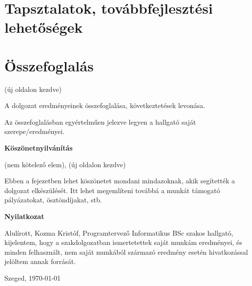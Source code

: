 \documentclass[a4paper,12pt]{report}
\theoremstyle{definition}
\theoremstyle{remark}
\begin{document}
\chapter*{Tapsztalatok, továbbfejlesztési lehetőségek}


\chapter{Összefoglalás}

(új oldalon kezdve)

A dolgozat eredményeinek összefoglalása, következtetések levonása.

Az összefoglalásban egyértelműen jelezve legyen a hallgató saját szerepe/eredményei.


\newpage
{\Huge \bf Köszönetnyilvánítás}


\vspace{2 cm}

(nem kötelező elem), (új oldalon kezdve) 

Ebben a fejezetben lehet köszönetet mondani mindazoknak, akik segítették a dolgozat elkészülését. Itt lehet megemlíteni továbbá a munkát támogató pályázatokat, ösztöndíjakat, stb.

\newpage
{\Huge \bf Nyilatkozat}


\vspace{2 cm}

Alulírott, Kozma Kristóf, Programtervező Informatikus BSc szakos hallgató, kijelentem, hogy a szakdolgozatban ismertetettek saját munkám eredményei, és minden felhasznált, nem saját munkából származó eredmény esetén hivatkozással jelöltem annak forrását. 


\begin{flushleft}
\vspace*{1cm}
Szeged, \today
\end{flushleft}

\begin{flushright}
   \vspace*{1cm}
   \makebox[7cm]{\rule{6cm}{.4pt}}\\
\end{flushright}
\end{document}
